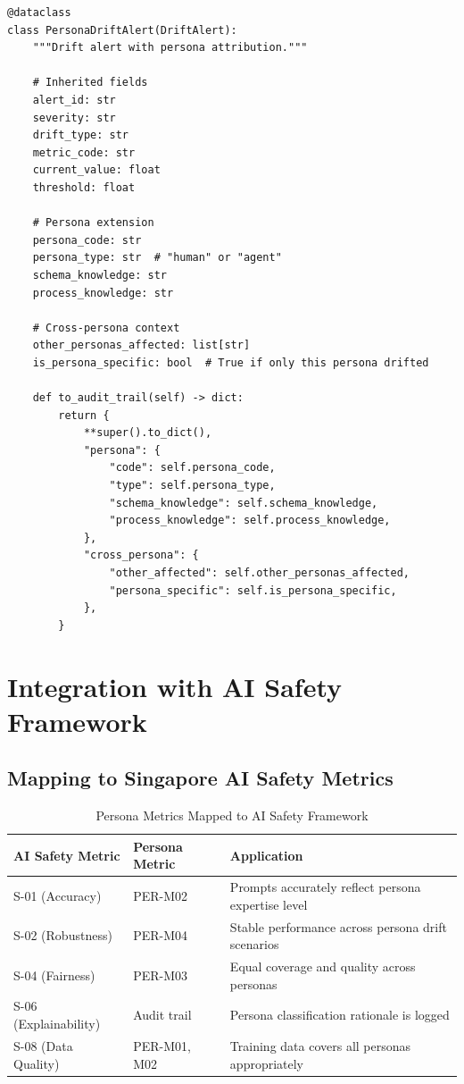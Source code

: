 \begin{lstlisting}[language=jsonx,caption={Extended drift alert with persona}]
@dataclass
class PersonaDriftAlert(DriftAlert):
    """Drift alert with persona attribution."""
    
    # Inherited fields
    alert_id: str
    severity: str
    drift_type: str
    metric_code: str
    current_value: float
    threshold: float
    
    # Persona extension
    persona_code: str
    persona_type: str  # "human" or "agent"
    schema_knowledge: str
    process_knowledge: str
    
    # Cross-persona context
    other_personas_affected: list[str]
    is_persona_specific: bool  # True if only this persona drifted
    
    def to_audit_trail(self) -> dict:
        return {
            **super().to_dict(),
            "persona": {
                "code": self.persona_code,
                "type": self.persona_type,
                "schema_knowledge": self.schema_knowledge,
                "process_knowledge": self.process_knowledge,
            },
            "cross_persona": {
                "other_affected": self.other_personas_affected,
                "persona_specific": self.is_persona_specific,
            },
        }
\end{lstlisting}

\section{Integration with AI Safety Framework}
\label{sec:ai-safety-integration}

\subsection{Mapping to Singapore AI Safety Metrics}

\begin{table}[htbp]
\centering
\footnotesize
\caption{Persona Metrics Mapped to AI Safety Framework}
\label{tab:ai-safety-mapping}
\begin{tabularx}{\textwidth}{@{}l l X@{}}
\toprule
\textbf{AI Safety Metric} & \textbf{Persona Metric} & \textbf{Application} \\
\midrule
S-01 (Accuracy) & PER-M02 & Prompts accurately reflect persona expertise level \\
S-02 (Robustness) & PER-M04 & Stable performance across persona drift scenarios \\
S-04 (Fairness) & PER-M03 & Equal coverage and quality across personas \\
S-06 (Explainability) & Audit trail & Persona classification rationale is logged \\
S-08 (Data Quality) & PER-M01, M02 & Training data covers all personas appropriately \\
\bottomrule
\end{tabularx}
\end{table}

